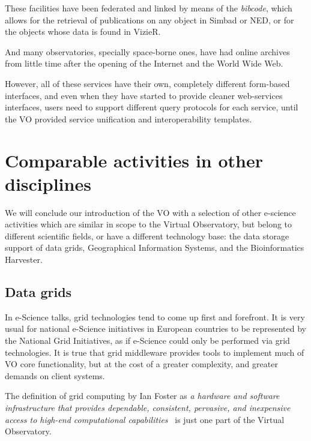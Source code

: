 {		These facilities have been federated and linked by means of
		the \emph{bibcode}, which allows for the retrieval of
		publications on any object in Simbad or NED, or for the
		objects whose data is found in VizieR.
		
		 And many observatories, specially space-borne ones, have
		had online archives from little time after the opening of
		the Internet and the World Wide Web.
		
		 However, all of these services have their own, completely
		different form-based interfaces, and even when they have
		started to provide cleaner web-services interfaces, users
		need to support different query protocols for each service,
		until the VO provided service unification and
		interoperability templates.
		}

	\section{Comparable activities in other disciplines} %
	\label{sec:comparable_activities_in_other_disciplines}
	
	We will conclude our introduction of the VO with a selection of
	other e-science activities which are similar in scope to the
	Virtual Observatory, but belong to different scientific fields,
	or have a different technology base: the data storage support
	of data grids, Geographical Information Systems, and the
	Bioinformatics Harvester.
	
	\subsection{Data grids} %
	\label{sub:data_grids}
	
		In e-Science talks, grid technologies tend to come up first
		and forefront. It is very usual for national e-Science
		initiatives in European countries to be represented by the
		National Grid Initiatives, as if e-Science could only be
		performed via grid technologies. It is true that grid
		middleware provides tools to implement much of VO core
		functionality, but at the cost of a greater complexity, and
		greater demands on client systems.
		
		 The definition of grid computing by Ian Foster as \emph{a
		hardware and software infrastructure that provides
		dependable, consistent, pervasive, and inexpensive access to
		high-end computational
		capabilities}~\cite{1999gbnc.book.....F} is just one part
		of the Virtual Observatory.
		

